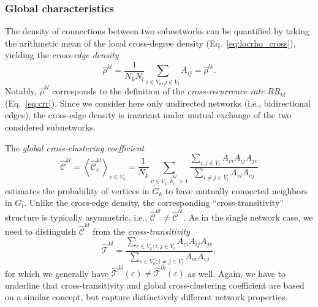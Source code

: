 		\subsubsection{Global characteristics}
		The density of connections between two subnetworks can be quantified by taking the arithmetic mean of the local cross-degree density (Eq.~\ref{eq:locrho_cross}), yielding the \textit{cross-edge density}
\begin{equation}
\hat{\rho}^{kl} = \frac{1}{N_k N_l} \sum_{i \in V_k, j \in V_l} A_{ij} = \hat{\rho}^{lk}.
\label{eq:globrho_cross}
\end{equation}
Notably, $\hat{\rho}^{kl}$ corresponds to the definition of the \textit{cross-recurrence rate} $RR_{kl}$ (Eq.~\ref{eq:crr}). Since we consider here only undirected networks (i.e., bidirectional edges), the cross-edge density is invariant under mutual exchange of the two considered subnetworks.

		The \textit{global cross-clustering coefficient}
\begin{equation}
\hat{\mathcal{C}}^{kl} = \left<\hat{\mathcal{C}}_v^{kl}\right>_{v \in V_k} = \frac{1}{N_k} \sum_{v \in V_k, \hat{k}_v^{kl}>1} \frac{\sum_{i,j \in V_l} A_{vi} A_{ij} A_{jv}}{\sum_{i \neq j \in V_l} A_{vi} A_{vj}}
\label{eq:globclustering_cross}
\end{equation}
estimates the probability of vertices in $G_k$ to have mutually connected neighbors in $G_l$. Unlike the cross-edge density, the corresponding ``cross-transitivity'' structure is typically asymmetric, i.e., $\hat{\mathcal{C}}^{kl} \neq \hat{\mathcal{C}}^{lk}$. As in the single network case, we need to distinguish $\hat{\mathcal{C}}^{kl}$ from the \textit{cross-transitivity}
\begin{equation}
\hat{\mathcal{T}}^{kl} = \frac{\sum_{v \in V_k; i,j \in V_l} A_{vi} A_{ij} A_{jv}}{\sum_{v \in V_k; i \neq j \in V_l} A_{vi}  A_{vj}},
\label{eq:transitivity_cross}
\end{equation}
for which we generally have $\hat{\mathcal{T}}^{kl}(\varepsilon) \neq \hat{\mathcal{T}}^{lk}(\varepsilon)$ as well. Again, we have to underline that cross-transitivity and global cross-clustering coefficient are based on a similar concept, but capture distinctively different network properties.


